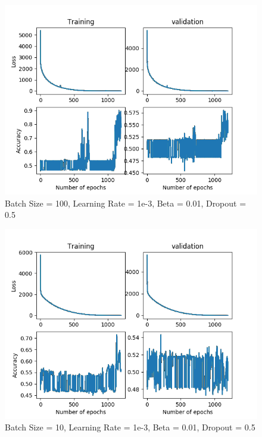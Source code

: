 \documentclass[12pt,reqno]{amsart}
\numberwithin{equation}{section}
\begin{document}
\begin{enumerate}
\begin{figure}[H]
\centering
\includegraphics[scale=0.6]{data12-1e-3-100-1e-2-5e-1}
\caption{Batch Size = 100, Learning Rate = 1e-3, Beta = 0.01, Dropout = 0.5}
\end{figure}

\begin{figure}[H]
\centering
\includegraphics[scale=0.6]{data12-1e-3-10-1e-2-5e-1}
\caption{Batch Size = 10, Learning Rate = 1e-3, Beta = 0.01, Dropout = 0.5}
\end{figure}


\end{enumerate}
\end{document}
